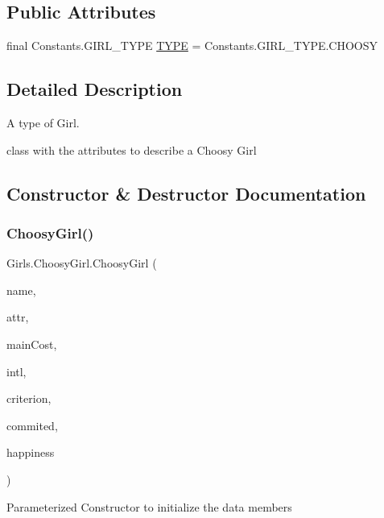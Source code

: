 \subsection*{Public Attributes}
\begin{DoxyCompactItemize}
\item 
final Constants.\+G\+I\+R\+L\+\_\+\+T\+Y\+PE \hyperlink{class_girls_1_1_choosy_girl_a80b299e65fa892996c25a1bb3af673ba}{T\+Y\+PE} = Constants.\+G\+I\+R\+L\+\_\+\+T\+Y\+P\+E.\+C\+H\+O\+O\+SY
\end{DoxyCompactItemize}


\subsection{Detailed Description}
A type of Girl. 

class with the attributes to describe a Choosy Girl 

\subsection{Constructor \& Destructor Documentation}
\mbox{\label{class_girls_1_1_choosy_girl_ae2eea627b7e0cff8d4bdd2eef95fec10}} 
\subsubsection{\texorpdfstring{Choosy\+Girl()}{ChoosyGirl()}\hspace{0.1cm}{\footnotesize\ttfamily [1/2]}}
{\footnotesize\ttfamily Girls.\+Choosy\+Girl.\+Choosy\+Girl (\begin{DoxyParamCaption}\item[{String}]{name,  }\item[{int}]{attr,  }\item[{int}]{main\+Cost,  }\item[{int}]{intl,  }\item[{Constants.\+C\+R\+I\+T\+E\+R\+I\+ON}]{criterion,  }\item[{boolean}]{commited,  }\item[{double}]{happiness }\end{DoxyParamCaption})\hspace{0.3cm}{\ttfamily [inline]}}

Parameterized Constructor to initialize the data members \mbox{\label{class_girls_1_1_choosy_girl_a832f2a6b8040c2a65e408a0a3ef26fc3}} 

